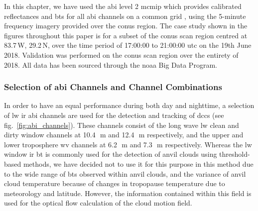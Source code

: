 In this chapter, we have used the \acrshort{abi} level 2 \acrshort{mcmip} which provides calibrated reflectances and \acrshort{bt}s for all \acrshort{abi} channels on a common grid \citep{schmit_chapter_2020}, using the 5-minute frequency imagery provided over the \acrshort{conus} region.
The case study shown in the figures throughout this paper is for a subset of the \acrshort{conus} scan region centred at 83.7\,\textdegree W, 29.2\,\textdegree N, over the time period of 17:00:00 to 21:00:00 \acrshort{utc} on the 19th June 2018.
Validation was performed on the \acrshort{conus} scan region over the entirety of 2018.
All data has been sourced through the \acrshort{noaa} Big Data Program.



\subsubsection{Selection of \acrshort{abi} Channels and Channel Combinations}

In order to have an equal performance during both day and nighttime, a selection of \acrshort{lw} \acrshort{ir} \acrshort{abi} channels are used for the detection and tracking of \acrshort{dcc}s (see fig.~\ref{fig:abi_channels}). 
These channels consist of the long wave \acrshort{lw} clean and dirty window channels at 10.4\,\unit{\mu m} and 12.4\,\unit{\mu m} respectively, and the upper and lower troposphere \acrshort{wv} channels at 6.2\,\unit{\mu m} and 7.3\,\unit{\mu m} respectively.
Whereas the \acrshort{lw} window \acrshort{ir} \acrshort{bt} is commonly used for the detection of anvil clouds using threshold-based methods, we have decided not to use it for this purpose in this method due to the wide range of \acrshort{bt}s observed within anvil clouds, and the variance of anvil cloud temperature because of changes in tropopause temperature due to meteorology and latitude.
However, the information contained within this field is used for the optical flow calculation of the cloud motion field.



